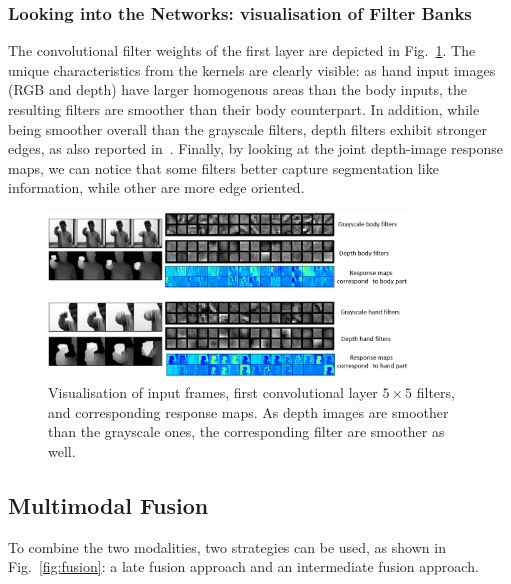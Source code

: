 
\subsubsection{Looking into the Networks: visualisation of Filter Banks}

The convolutional filter weights of the first layer are depicted in Fig.~\ref{3dcnn_filters}.
The unique characteristics from the kernels are clearly visible: as hand input images (RGB and depth) have larger homogenous areas
than the body inputs, the resulting filters are smoother than their body counterpart.
In addition, while being smoother overall than the grayscale filters, depth filters exhibit stronger edges,
as also reported in~\cite{socher2012convolutional}.
%
Finally, by looking at the joint depth-image response maps, we can notice that some filters better capture segmentation like information,
while other are more edge oriented.

\begin{figure}[t]
  \centering
  \includegraphics[width=0.85\textwidth]{images/CNN_filters}
  \caption{
  \small{Visualisation of input frames, first convolutional layer $5\times5$ filters, and corresponding response maps.
As depth images are smoother than the grayscale ones, the corresponding filter are smoother as well.}
}\label{3dcnn_filters}
\end{figure}


\subsection{Multimodal Fusion}
To combine the two modalities, two strategies can be used, as shown in Fig.~\ref{fig:fusion}:
a late fusion approach and an intermediate fusion approach.


